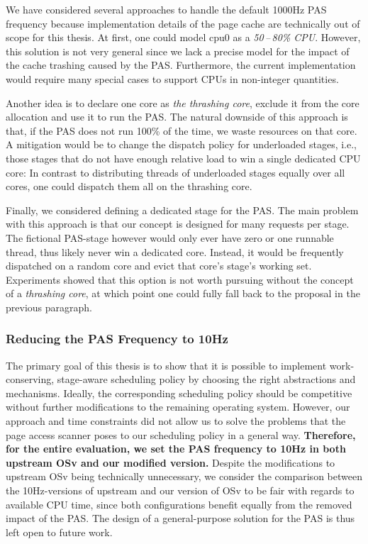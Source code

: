 \documentclass[12pt,a4paper]{book}
\begin{document}
We have considered several approaches to handle the default 1000Hz PAS frequency because implementation details of the page cache are technically out of scope for this thesis.
At first, one could model cpu0 as a \emph{{50\,--\,80\%} CPU}.
However, this solution is not very general since we lack a precise model for the impact of the cache trashing caused by the PAS.
Furthermore, the current implementation would require many special cases to support CPUs in non-integer quantities.

Another idea is to declare one core as \emph{the thrashing core}, exclude it from the core allocation and use it to run the PAS.
The natural downside of this approach is that, if the PAS does not run 100\% of the time, we waste resources on that core.
A mitigation would be to change the dispatch policy for underloaded stages, i.e., those stages that do not have enough relative load to win a single dedicated CPU core:
In contrast to distributing threads of underloaded stages equally over all cores, one could dispatch them all on the thrashing core.

Finally, we considered defining a dedicated stage for the PAS.
The main problem with this approach is that our concept is designed for many requests per stage.
The fictional PAS-stage however would only ever have zero or one runnable thread, thus likely never win a dedicated core.
Instead, it would be frequently dispatched on a random core and evict that core's stage's working set.
Experiments showed that this option is not worth pursuing without the concept of a \emph{thrashing core}, at which point one could fully fall back to the proposal in the previous paragraph.

\subsubsection{Reducing the PAS Frequency to 10Hz}\label{ch:di:pol:pas:eval}
The primary goal of this thesis is to show that it is possible to implement work-conserving, stage-aware scheduling policy by choosing the right abstractions and mechanisms.
Ideally, the corresponding scheduling policy should be competitive without further modifications to the remaining operating system.
However, our approach and time constraints did not allow us to solve the problems that the page access scanner poses to our scheduling policy in a general way.
\textbf{Therefore, for the entire evaluation, we set the PAS frequency to 10Hz in both upstream OSv and our modified version.}
Despite the modifications to upstream OSv being technically unnecessary, we consider the comparison between the 10Hz-versions of upstream and our version of OSv to be fair with regards to available CPU time, since both configurations benefit equally from the removed impact of the PAS.
The design of a general-purpose solution for the PAS is thus left open to future work.
\end{document}
